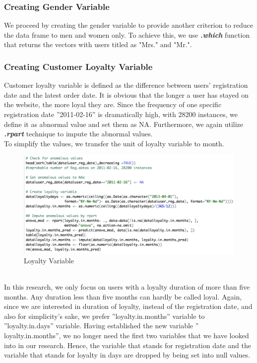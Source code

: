 \documentclass[a4paper,12pt,fleqn]{article}
\begin{document}
\subsubsection{Creating Gender Variable}
We proceed by creating the gender variable to provide another criterion to reduce the data frame to men and women only. To achieve this, we use \textbf{\textit{.which}} function that returns the vectors with users titled as "Mrs." and "Mr.".

\subsubsection{Creating Customer Loyalty Variable}
Customer loyalty variable is defined as the difference between users' registration date and the latest order date. It is obvious that the longer a user has stayed on the website, the more loyal they are. Since the frequency of one specific registration date ''2011-02-16'' is dramatically high, with 28200 instances, we define it as abnormal value and set them as NA. Furthermore, we again utilize \textbf{\textit{.rpart}} technique to impute the abnormal values. \\To simplify the values, we transfer the unit of loyalty variable to month. \\
\begin{figure}[h]
	\centering
	\includegraphics[width=0.95\linewidth]{"2.loyalty variable"}
	\caption{Loyalty Variable}
	\label{fig:2}
\end{figure}\\
In this research, we only focus on users with a loyalty duration of more than five months. Any duration less than five months can hardly be called loyal. Again, since we are interested in duration of loyalty, instead of the registration date, and also for simplicity's sake, we prefer ''loyalty.in.months'' variable to ''loyalty.in.days'' variable. Having established the new variable '' loyalty.in.months'',  we no longer need the first two variables that we have looked into in our research. Hence, the variable that stands for registration date and the variable that stands for loyalty in days are dropped by being set into null values.
\end{document}
